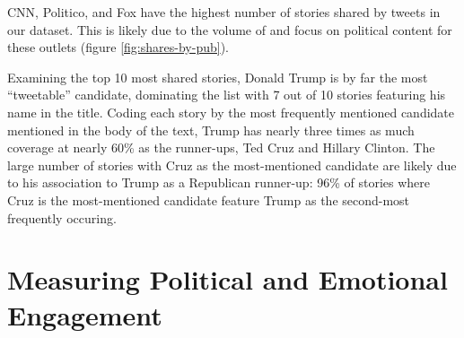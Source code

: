 \documentclass[letterpaper]{article}
\begin{document}




CNN, Politico, and Fox have the highest number of stories shared by tweets in our dataset. This is likely due to the volume of and focus on political content for these outlets (figure \ref{fig:shares-by-pub}).  




Examining the top 10 most shared stories, Donald Trump is by far the most ``tweetable'' candidate, dominating the list with 7 out of 10 stories featuring his name in the title. Coding each story by the most frequently mentioned candidate mentioned in the body of the text, Trump has nearly three times as much coverage at nearly 60\% as the runner-ups, Ted Cruz and Hillary Clinton. The large number of stories with Cruz as the most-mentioned candidate are likely due to his association to Trump as a Republican runner-up: 96\% of stories where Cruz is the most-mentioned candidate feature Trump as the second-most frequently occuring. 

\section{Measuring Political and Emotional Engagement}
\end{document}
